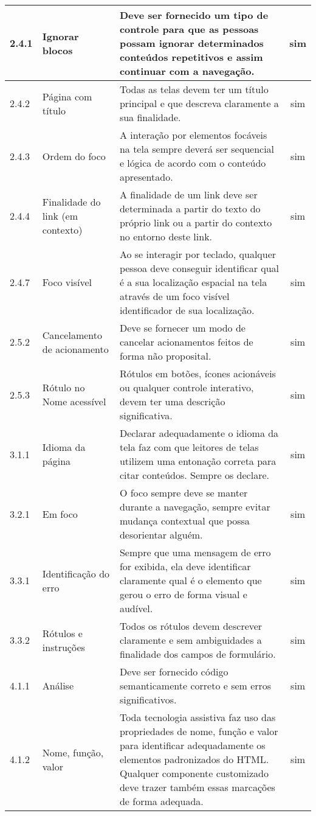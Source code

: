 \begin{appendices}
{\begin{minipage}{\linewidth}
{\begin{tabular}{|l|l|p{400px}|c|}
    2.4.1 & 
        Ignorar blocos & Deve ser fornecido um tipo de controle para que as pessoas possam ignorar determinados conteúdos repetitivos e assim continuar com a navegação. & sim\\\hline
    2.4.2 & 
        Página com título & Todas as telas devem ter um título principal e que descreva claramente a sua finalidade. & sim  \\\hline
    2.4.3 & 
        Ordem do foco & A interação por elementos focáveis na tela sempre deverá ser sequencial e lógica de acordo com o conteúdo apresentado. & sim \\\hline
    2.4.4 & 
        Finalidade do link (em contexto) & A finalidade de um link deve ser determinada a partir do texto do próprio link ou a partir do contexto no entorno deste link. & sim\\\hline
    2.4.7 & 
        Foco visível & Ao se interagir por teclado, qualquer pessoa deve conseguir identificar qual é a sua localização espacial na tela através de um foco visível identificador de sua localização. & sim \\\hline
    2.5.2 & 
        Cancelamento de acionamento & Deve se fornecer um modo de cancelar acionamentos feitos de forma não proposital. & sim\\\hline
    2.5.3 & 
        Rótulo no Nome acessível & Rótulos em botões, ícones acionáveis ou qualquer controle interativo, devem ter uma descrição significativa. & sim \\\hline
    3.1.1 & 
        Idioma da página & Declarar adequadamente o idioma da tela faz com que leitores de telas utilizem uma entonação correta para citar conteúdos. Sempre os declare. & sim\\\hline
    3.2.1 & 
        Em foco & O foco sempre deve se manter durante a navegação, sempre evitar mudança contextual que possa desorientar alguém. & sim \\\hline
    3.3.1 & 
        Identificação do erro & Sempre que uma mensagem de erro for exibida, ela deve identificar claramente qual é o elemento que gerou o erro de forma visual e audível. & sim\\\hline
    3.3.2 & 
        Rótulos e instruções & Todos os rótulos devem descrever claramente e sem ambiguidades a finalidade dos campos de formulário. & sim\\\hline
    4.1.1 & 
        Análise & Deve ser fornecido código semanticamente correto e sem erros significativos. & sim\\\hline
    4.1.2 & 
        Nome, função, valor & Toda tecnologia assistiva faz uso das propriedades de nome, função e valor para identificar adequadamente os elementos padronizados do HTML. Qualquer componente customizado deve trazer também essas marcações de forma adequada. 
        & sim\\ \hline
\end{tabular}
}
\label{Diretrizes nível A}


\end{minipage}}
\end{appendices}
